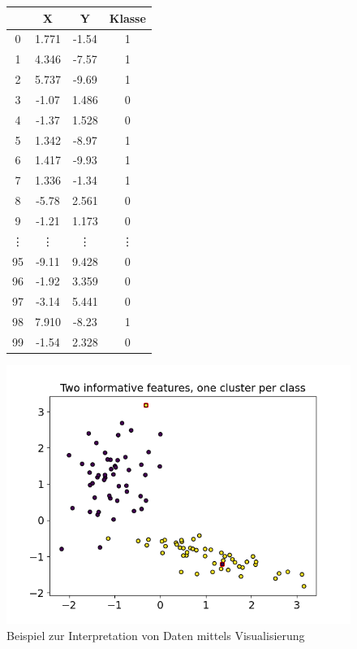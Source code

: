 \begin{figure}[H]
    \begin{minipage}{0.4\linewidth}
        \centering
        \begin{tabular}{ |c|c|c|c| } 
         \hline
           & X & Y & Klasse \\
          \hline
          0 & 1.771 & -1.54 & 1 \\
          1 & 4.346 & -7.57 & 1 \\
          2 & 5.737 & -9.69 & 1 \\
          3 & -1.07 & 1.486 & 0 \\
          4 & -1.37 & 1.528 & 0 \\
          5 & 1.342 & -8.97 & 1 \\
          6 & 1.417 & -9.93 & 1 \\
          7 & 1.336 & -1.34 & 1 \\
          8 & -5.78 & 2.561 & 0 \\
          9 & -1.21 & 1.173 & 0 \\
          \vdots & \vdots & \vdots & \vdots \\
          95 & -9.11 & 9.428 & 0 \\
          96 & -1.92 & 3.359 & 0 \\
          97 & -3.14 & 5.441 & 0 \\
          98 & 7.910 & -8.23 & 1 \\
          99 & -1.54 & 2.328 & 0 \\
         \hline
        \end{tabular}
    \end{minipage}
    \hfill
    \begin{minipage}{0.6\linewidth}
        \includegraphics[width=1.1\linewidth]{images/visualization_advantage.png}
    \end{minipage}
    
    \caption{Beispiel zur Interpretation von Daten mittels Visualisierung}
    \label{fig:visualization_advantage}
\end{figure}

